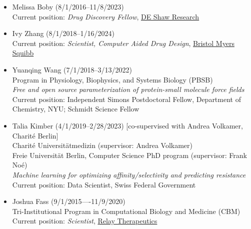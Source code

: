 \documentclass[10pt]{article}
\begin{document}
\begin{itemize}
  \item Melissa Boby (8/1/2016--11/8/2023)\\
Current position: \emph{Drug Discovery Fellow}, \href{https://www.deshawresearch.com/}{DE Shaw Research}

  \item Ivy Zhang (8/1/2018--1/16/2024)\\
  Current position: \emph{Scientist, Computer Aided Drug Design}, \href{https://www.bms.com/}{Bristol Myers Squibb}
 
  \item Yuanqing Wang (7/1/2018--3/13/2022)\\
  Program in Physiology, Biophysics, and Systems Biology (PBSB)\\
  \emph{Free and open source parameterization of protein-small molecule force fields}\\
  Current position: Independent Simons Postdoctoral Fellow, Department of Chemistry, NYU; Schmidt Science Fellow

  \item Talia Kimber (4/1/2019--2/28/2023) [co-supervised with Andrea Volkamer, Charit\'e Berlin] \\
  Charit\'e Universit\"{a}tmedizin (supervisor: Andrea Volkamer)\\
  Freie Universit\"{a}t Berlin, Computer Science PhD program (supervisor: Frank No\'{e})\\
  \emph{Machine learning for optimizing affinity/selectivity and predicting resistance}\\
  Current position: Data Scientist, Swiss Federal Government
  
  \item Joshua Fass (9/1/2015----11/9/2020)\\
  Tri-Institutional Program in Computational Biology and Medicine (CBM)\\
  Current position: \emph{Scientist}, \href{https://relaytx.com/}{Relay Therapeutics}
  

\end{itemize}
\end{document}
